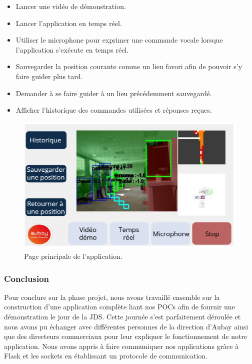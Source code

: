 \documentclass[11pt]{article}
\begin{document}
        \begin{itemize}
          \item Lancer une vidéo de démonstration.
          \item Lancer l'application en temps réel.
          \item Utiliser le microphone pour exprimer une commande vocale lorsque l'application s'exécute en temps réel.
          \item Sauvegarder la position courante comme un lieu favori afin de pouvoir s'y faire guider plus tard.
          \item Demander à se faire guider à un lieu précédemment sauvegardé.
          \item Afficher l'historique des commandes utilisées et réponses reçues.   
        \end{itemize}       

        \begin{figure}[hbt]  
          \includegraphics[width=\textwidth]{Application.png}    
          \caption{Page principale de l'application.}
          \label{fig:Application}
        \end{figure}     

      \subsubsection{Conclusion}
        Pour conclure sur la phase projet, nous avons travaillé ensemble sur la construction d'une application complète liant nos POCs afin de
        fournir une démonstration le jour de la JDS. Cette journée s'est parfaitement déroulée et nous avons pu échanger avec différentes
        personnes de la direction d'Aubay ainsi que des directeurs commerciaux pour leur expliquer le fonctionnement de notre application.
        Nous avons appris à faire communiquer nos applications grâce à Flask et les sockets en établissant un protocole de communication.
\end{document}
